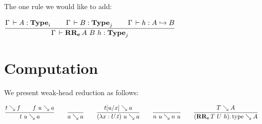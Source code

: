 \documentclass[a4paper,english]{lipics-utf8x}
\begin{document}
  The one rule we would like to add:

  \begin{center}
  \(
    \ru{\Gamma \der A : \Type_i \qquad
        \Gamma \der B : \Type_j \qquad
        \Gamma \der h : \emb{A}{B}
      }{\Gamma \der \RRe{A}{B}{h} : \Type_j}
  \)
  \end{center}

\section{Computation}

We present weak-head reduction as follows:

\begin{center}
\(
  \ru{t \rew f \qquad
      f~u \rew a
    }{t~u \rew a}
  \qquad
  \ru{}{a \rew a}
  \qquad
  \ru{t[u/x] \rew a
    }{(\lambda x:U.t)~u \rew a}
  \qquad
  \ru{}{n~u \rew n~u}
  \qquad
  \ru{T \rew A
    }{(\RRe{T}{U}{h}).\type \rew A}
\)
\end{center}
\end{document}
